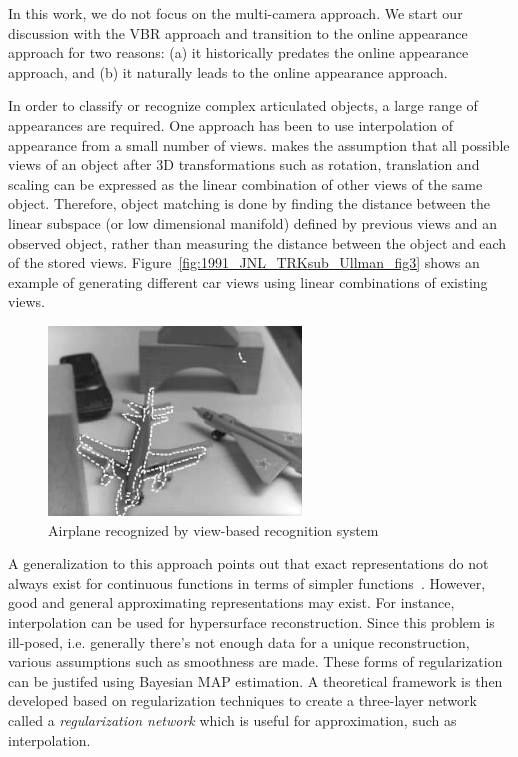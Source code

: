 \begin{Body}
In this work, we do not focus on the multi-camera approach.  We start our discussion with the VBR approach and transition to the online appearance approach for two reasons: (a) it historically predates the online appearance approach, and (b) it naturally leads to the online appearance approach.

In order to classify or recognize complex articulated objects, a large range of appearances are required.  One approach has been to use interpolation of appearance from a small number of views.  \cite{1991_JNL_Recog_Ullman} makes the assumption that all possible views of an object after 3D transformations such as rotation, translation and scaling can be expressed as the linear combination of other views of the same object.  Therefore, object matching is done by finding the distance between the linear subspace (or low dimensional manifold) defined by previous views and an observed object, rather than measuring the distance between the object and each of the stored views.  Figure~\ref{fig:1991_JNL_TRKsub_Ullman_fig3} shows an example of generating different car views using linear combinations of existing views.  



								\begin{figure}[t]
								\center
								\includegraphics[width=0.6\textwidth]{thesis/1992_JNL_VBR_Breuel_fig1.png}
								\caption{Airplane recognized by view-based recognition system \cite{1992_JNL_VBR_Breuel}}
								\label{fig:1992_JNL_VBR_Breuel_fig1}
								\end{figure}

A generalization to this approach points out that exact representations do not always exist for continuous functions in terms of simpler functions~\cite{1990_JNL_Network_Poggio}.  However, good and general approximating representations may exist.  For instance, interpolation can be used for hypersurface reconstruction.  Since this problem is ill-posed, i.e. generally there's not enough data for a unique reconstruction, various assumptions such as smoothness are made.  These forms of regularization can be justifed using Bayesian MAP estimation.  A theoretical framework is then developed based on regularization techniques to create a three-layer network called a \emph{regularization network} which is useful for approximation, such as interpolation.


\end{Body}

